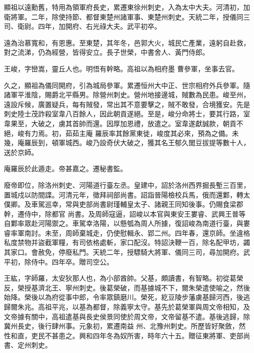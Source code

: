\begin{pinyinscope}
 顯祖以遠勳舊，特用為領軍府長史，累遷東徐州刺史，入為太中大夫。河清初，加衛將軍。二年，除使持節、都督東楚州諸軍事、東楚州刺史。天統二年，授儀同三司、衛尉。四年，加開府、右光祿大夫。武平初卒。



 遠為治慕寬和，有恩惠。至東楚，其年冬，邑郭大火，城民亡產業，遠躬自赴救，對之流涕，仍為經營，皆得安立。長子世榮，中書舍人、黃門侍郎。



 王峻，字巒嵩，靈丘人也。明悟有幹略。高祖以為相府墨
 曹參軍，坐事去官。



 久之，顯祖為儀同開府，引為城局參軍。累遷恒州大中正、世宗相府外兵參軍。隨諸軍平淮陰，賜爵北平縣男。除營州刺史。營州地接邊城，賊數為民患。峻至州，遠設斥候，廣置疑兵，每有賊發，常出其不意要擊之，賊不敢發，合境獲安。先是刺史陸士茂詐殺室韋八百餘人，因此朝貢遂絕。至是，峻分命將士，要其行路，室韋果至，大破之，虜其首帥而還。因厚加恩禮，放遣之。室韋遂獻誠款，朝貢不絕，峻有力焉。初，茹茹主庵
 羅辰率其餘黨東徙，峻度其必來，預為之備。未幾，庵羅辰到，頓軍城西。峻乃設奇伏大破之，獲其名王郁久閭豆拔提等數十人，送於京師。



 庵羅辰於此遁走。帝甚嘉之。遷秘書監。



 廢帝即位，除洛州刺史、河陽道行臺左丞。皇建中，詔於洛州西界掘長塹三百里，置城戍以防間諜。河清元年，徵拜祠部尚書。詔詣晉陽檢校兵馬，俄而還鄴，轉太僕卿。及車駕巡幸，常與吏部尚書尉瑾輔皇太子、諸親王同知後事。仍賜食梁郡幹，遷侍中，除都官
 尚書。及周師寇逼，詔峻以本官與東安王婁睿、武興王普等自鄴率眾赴河陽禦之。車駕幸洛陽，以懸瓠為周人所據，復詔峻為南道行臺，與婁睿率軍南討。未至，周師棄城走，仍使慰輯永、郢二州。四年春，還京師。坐違格私度禁物并盜截軍糧，有司依格處斬，家口配沒。特詔決鞭一百，除名配甲坊，蠲其家口。會赦免，停廢私門。天統二年，授驃騎大將軍、儀同三司，尋加開府。武平初，除侍中。四年卒。贈司空公。



 王紘，字師羅，太安狄那人也，為小部酋帥。父基，頗讀書，有智略。初從葛榮反，榮授基濟北王、寧州刺史。後葛榮破，而基據城不下，爾朱榮遣使喻之，然後始降。榮後以為府從事中郎，令率眾鎮磨川。榮死，紇豆陵步藩虜基歸河西，後逃歸爾朱兆。高祖平兆，以基為都督，除義寧太守。基先於葛榮軍與周文帝相知，及文帝據有關中，高祖遣基與長史侯景同使於周文帝，文帝留基不遣。基後逃歸，除冀州長史，後行肆州事。元象初，累遷南益
 州、北豫州刺史。所歷皆好聚斂，然性和直，吏民不甚患之。興和四年冬為奴所害，時年六十五。贈征東將軍、吏部尚書、定州刺史。




\end{pinyinscope}
